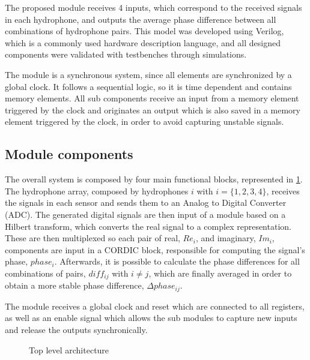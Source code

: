 The proposed module receives 4 inputs, which correspond to the received signals in each hydrophone, and outputs the average phase difference between all combinations of hydrophone pairs. This model was developed using Verilog, which is a commonly used hardware description language, and all designed components were validated with testbenches through simulations.

The module is a synchronous system, since all elements are synchronized by a global clock. It follows a sequential logic, so it is time dependent and contains memory elements. All sub components receive an input from a memory element triggered by the clock and originates an output which is also saved in a memory element triggered by the clock, in order to avoid capturing unstable signals.

\subsection{Module components}

The overall system is composed by four main functional blocks, represented in \ref{fig:module-all}. The hydrophone array, composed by hydrophones $i$ with $i=\{1,2,3,4\}$, receives the signals in each sensor and sends them to an Analog to Digital Converter (ADC). The generated digital signals are then input of a module based on a Hilbert transform, which converts the real signal to a complex representation. These are then multiplexed so each pair of real, $Re_i$, and imaginary, $Im_i$, components are input in a CORDIC \cite{cordic-def} block, responsible for computing the signal's phase, $phase_i$. Afterwards, it is possible to calculate the phase differences for all combinations of pairs, $diff_{ij}$ with $i \neq j$, which are finally averaged in order to obtain a more stable phase difference, $\Delta phase_{ij}$.

The module receives a global clock and reset which are connected to all registers, as well as an enable signal which allows the sub modules to capture new inputs and release the outputs synchronically.

\begin{figure}[!htbp]
	\captionsetup{justification=centering,margin=2cm}
	\caption{Top level architecture}
	\label{fig:module-all}
\end{figure}

